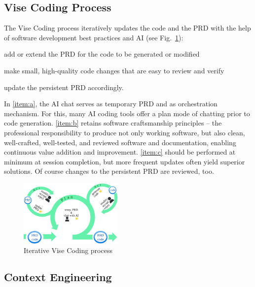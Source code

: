 \documentclass[twocolumn,german]{article}
\begin{document}
\subsection{Vise Coding Process}

The Vise Coding process iteratively updates the code and the PRD with the help of software development best practices and AI (see Fig.~\ref{fig:process}):
\begin{compactenum}[(a)]
\item add or extend the PRD for the code to be generated or modified\label{item:a} 
\item make small, high-quality code changes that are easy to review and verify\label{item:b}
\item update the persistent PRD accordingly.\label{item:c}
\end{compactenum}

In \ref{item:a}, the AI chat serves as temporary PRD and as orchestration mechanism.
For this, many AI coding tools offer a plan mode of chatting prior to code generation. 
\ref{item:b} retains software craftsmanship principles -- the professional responsibility to produce not only working software,
but also clean, well-crafted, well-tested, and reviewed software and documentation,
enabling continuous value addition and improvement.
\ref{item:c} should be performed at minimum at session completion,
but more frequent updates often yield superior solutions.
Of course changes to the persistent PRD are reviewed, too.

\begin{figure}[hbt!]
  \begin{center}
  \vspace{-4mm}
  \includegraphics[width=0.45\textwidth]{figures/vise_process_v2}
  \vspace{-4mm}
\caption{Iterative Vise Coding process}
\label{fig:process}
\end{center}
\end{figure}

\subsection{Context Engineering}
\end{document}
